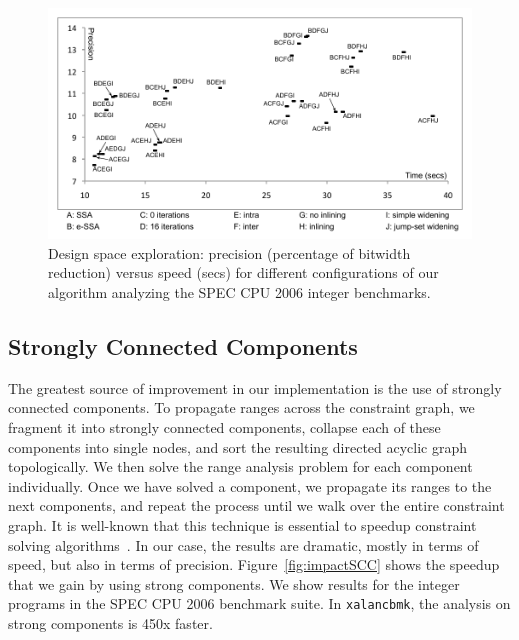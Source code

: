 \documentclass{llncs}
\begin{document}
\begin{figure}[t!]
\begin{center}
\includegraphics[width=\textwidth]{images/space}
\end{center}
\caption{\label{fig:space}
Design space exploration: precision (percentage of bitwidth reduction)
versus speed (secs) for different configurations of our algorithm analyzing
the SPEC CPU 2006 integer benchmarks.}
\end{figure}

\subsection{Strongly Connected Components}
\label{sub:sccs}

The greatest source of improvement in our implementation is the use of strongly
connected components.
To propagate ranges across the constraint graph, we fragment it
into strongly connected components, collapse each of these components into
single nodes, and sort the resulting directed acyclic graph topologically.
We then solve the range analysis problem for each component individually.
Once we have solved a component, we propagate its ranges to the next
components, and repeat the process until we walk over the entire constraint
graph.
It is well-known that this technique is essential to speedup constraint solving
algorithms~\cite[Sec 6.3]{Nielson99}.
In our case, the results are dramatic, mostly in terms of speed, but also in
terms of precision.
Figure~\ref{fig:impactSCC} shows the speedup that we gain by using strong
components.
We show results for the integer programs in the SPEC CPU 2006 benchmark suite.
In \texttt{xalancbmk}, the analysis on strong components is 450x faster.
\end{document}
